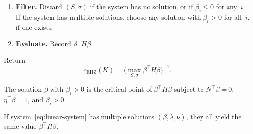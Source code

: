 \begin{algorithm}
\begin{enumerate}
\item \textbf{Filter.}
  Discard $(S, \sigma)$ if the system has no solution, or
  if $\beta_i \leq 0$ for any~$i$.
  If the system has multiple solutions, choose any solution
  with $\beta_i > 0$ for all~$i$, if one exists.

\item \textbf{Evaluate.}
  Record $\beta^\top H \beta$.
\end{enumerate}

\noindent
Return
\begin{equation}\label{eq:action-formula}
  c_{\mathrm{EHZ}}(K) = \bigl(\max_{S,\sigma} \beta^\top H \beta\bigr)^{-1}.
\end{equation}
\end{algorithm}

\begin{remark}\label{rem:critical-point}
The solution $\beta$ with $\beta_i > 0$
is the critical point of $\beta^\top H \beta$
subject to $N^\top \beta = 0$,
$\eta^\top \beta = 1$, and $\beta_i > 0$.
\end{remark}

\begin{lemma}\label{lem:well-defined}
If system~\eqref{eq:linear-system} has multiple solutions
$(\beta, \lambda, \nu)$, they all yield the same value
$\beta^\top H \beta$.
\end{lemma}

